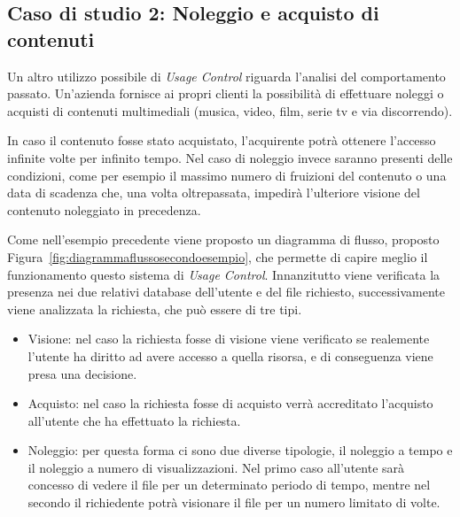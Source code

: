 \subsection{Caso di studio 2: Noleggio e acquisto di contenuti}
\label{sub:case2}

Un altro utilizzo possibile di \textit{Usage Control} riguarda l'analisi del comportamento passato. Un'azienda fornisce  ai propri clienti 
la possibilità di effettuare noleggi o acquisti di contenuti multimediali (musica, video, film, serie tv e via discorrendo).\par
In caso il contenuto fosse stato acquistato, l’acquirente potrà ottenere
l’accesso infinite volte per infinito tempo. Nel caso di noleggio invece
saranno presenti delle condizioni, come per esempio il massimo numero
di fruizioni del contenuto o una data di scadenza che, una volta oltrepassata,
impedirà l’ulteriore visione del contenuto noleggiato in precedenza.\par
Come nell’esempio precedente viene proposto un diagramma di flusso,
proposto Figura~\ref{fig:diagrammaflussosecondoesempio}, che permette di capire meglio il funzionamento questo sistema di \textit{Usage Control}. Innanzitutto viene verificata la presenza nei due relativi database dell'utente e del file richiesto, successivamente viene analizzata la richiesta, che può essere di tre tipi.
\begin{itemize}
\item Visione: nel caso la richiesta fosse di visione viene verificato se realemente l'utente ha diritto ad avere accesso a quella risorsa, e di conseguenza viene presa una decisione.
\item Acquisto: nel caso la richiesta fosse di acquisto verrà accreditato l'acquisto all'utente che ha effettuato la richiesta.
\item Noleggio: per questa forma ci sono due diverse tipologie, il noleggio a tempo e il noleggio a numero di visualizzazioni. Nel primo caso all'utente sarà concesso di vedere il file per un determinato periodo di tempo, mentre nel secondo il richiedente potrà visionare il file per un numero limitato di volte.
\end{itemize}
